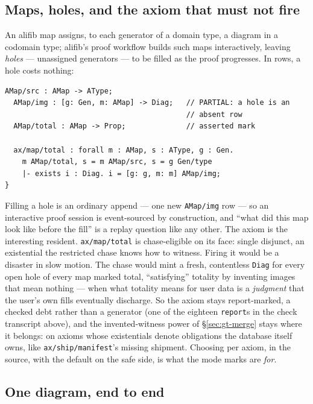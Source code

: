 \subsection{Maps, holes, and the axiom that must not fire}
\label{sec:gt-alifib-maps}

An alifib map assigns, to each generator of a domain type, a diagram
in a codomain type; alifib's proof workflow builds such maps
interactively, leaving \emph{holes} --- unassigned generators --- to be
filled as the proof progresses. In rows, a hole costs nothing:

\begin{Verbatim}[fontsize=\small,frame=leftline,rulecolor=\color{accentmid},framesep=3mm,xleftmargin=3mm]
  AMap/src : AMap -> AType;
  AMap/img : [g: Gen, m: AMap] -> Diag;   // PARTIAL: a hole is an
                                          // absent row
  AMap/total : AMap -> Prop;              // asserted mark

  ax/map/total : forall m : AMap, s : AType, g : Gen.
    m AMap/total, s = m AMap/src, s = g Gen/type
    |- exists i : Diag. i = [g: g, m: m] AMap/img;
}
\end{Verbatim}

\noindent Filling a hole is an ordinary append --- one new
\texttt{AMap/img} row --- so an interactive proof session is
event-sourced by construction, and ``what did this map look like
before the fill'' is a replay question like any other. The axiom is
the interesting resident. \texttt{ax/map/total} is chase-eligible on
its face: single disjunct, an existential the restricted chase knows
how to witness. Firing it would be a disaster in slow motion. The
chase would mint a fresh, contentless \texttt{Diag} for every open
hole of every map marked total, ``satisfying'' totality by inventing
images that mean nothing --- when what totality means for user data is
a \emph{judgment} that the user's own fills eventually discharge.
So the axiom stays report-marked, a checked debt rather than a
generator (one of the eighteen \texttt{report}s in the check
transcript above), and the invented-witness power of
\S\ref{sec:gt-merge} stays
where it belongs: on axioms whose existentials denote obligations the
database itself owns, like \texttt{ax/ship/manifest}'s missing
shipment. Choosing per axiom, in the source, with the default on the
safe side, is what the mode marks are \emph{for}.

\subsection{One diagram, end to end}
\label{sec:gt-alifib-e2e}

